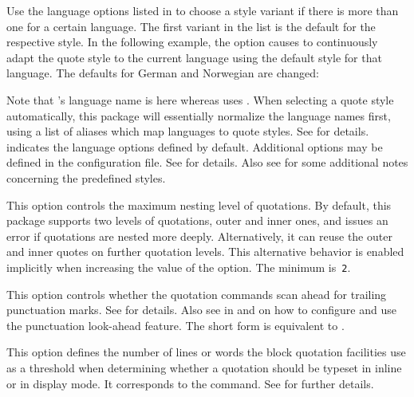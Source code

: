 \documentclass{ltxdockit}[2010/09/26]
\begin{document}
\begin{optionlist}

Use the language options listed in  to choose a style variant if there is more than one for a certain language. The first variant in the list is the default for the respective style. In the following example, the  option causes  to continuously adapt the quote style to the current language using the default style for that language. The defaults for German and Norwegian are changed:

\begin{ltxcode}
\usepackage[english,ngerman]{babel}
\usepackage[autostyle,german=guillemets,norwegian=quotes]{csquotes}
\end{ltxcode}
%
Note that 's language name is  here whereas  uses . When selecting a quote style automatically, this package will essentially normalize the language names first, using a list of aliases which map languages to quote styles. See  for details.  indicates the language options defined by default. Additional options may be defined in the configuration file. See  for details. Also see  for some additional notes concerning the predefined styles.


This option controls the maximum nesting level of quotations. By default, this package supports two levels of quotations, outer and inner ones, and issues an error if quotations are nested more deeply. Alternatively, it can reuse the outer and inner quotes on further quotation levels. This alternative behavior is enabled implicitly when increasing the value of the  option. The minimum is~\texttt{2}.


This option controls whether the quotation commands scan ahead for trailing punctuation marks. See  for details. Also see  in  and  on how to configure and use the punctuation look-ahead feature. The short form  is equivalent to .


This option defines the number of lines or words the block quotation facilities use as a threshold when determining whether a quotation should be typeset in inline or in display mode. It corresponds to the  command. See  for further details.


\end{optionlist}
\end{document}
